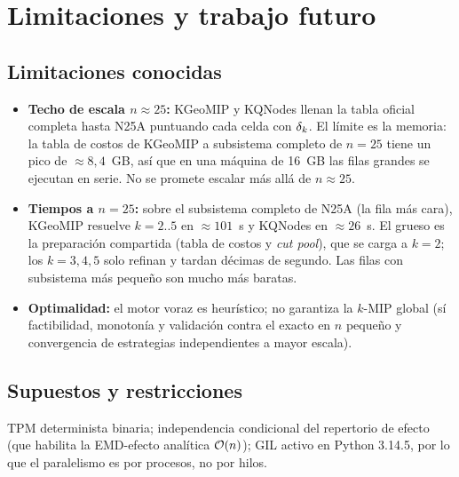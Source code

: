 \documentclass[11pt,letterpaper]{article}
\begin{document}
\section{Limitaciones y trabajo futuro}
\label{sec:limites}

\subsection{Limitaciones conocidas}
\begin{itemize}
	\item \textbf{Techo de escala $n\approx 25$:} KGeoMIP y KQNodes llenan la tabla
	      oficial completa hasta N25A puntuando cada celda con $\delta_k$. El límite es la
	      memoria: la tabla de costos de KGeoMIP a subsistema completo de $n=25$ tiene un
	      pico de $\approx 8{,}4$~GB, así que en una máquina de 16~GB las filas grandes se
	      ejecutan en serie. No se promete escalar más allá de $n\approx 25$.
	\item \textbf{Tiempos a $n=25$:} sobre el subsistema completo de N25A (la fila más
	      cara), KGeoMIP resuelve $k=2..5$ en $\approx 101$~s y KQNodes en $\approx 26$~s.
	      El grueso es la preparación compartida (tabla de costos y \emph{cut pool}), que se
	      carga a $k=2$; los $k=3,4,5$ solo refinan y tardan décimas de segundo. Las filas
	      con subsistema más pequeño son mucho más baratas.
	\item \textbf{Optimalidad:} el motor voraz es heurístico; no garantiza la
	      $k$-MIP global (sí factibilidad, monotonía y validación contra el exacto en $n$
	      pequeño y convergencia de estrategias independientes a mayor escala).
\end{itemize}

\subsection{Supuestos y restricciones}
TPM determinista binaria; independencia condicional del repertorio de efecto (que
habilita la EMD-efecto analítica $\mathcal{O}(n)$); GIL activo en Python 3.14.5, por lo
que el paralelismo es por procesos, no por hilos.
\end{document}
